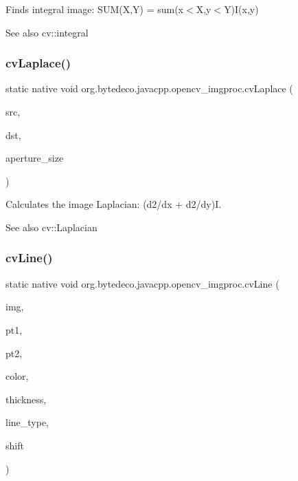 Finds integral image\+: S\+U\+M(\+X,\+Y) = sum(x$<$\+X,y$<$\+Y)I(x,y) 

\begin{DoxySeeAlso}{See also}
cv\+::integral 
\end{DoxySeeAlso}
\mbox{\label{group__imgproc__c_ga4b503d9c276d19dbced13ecd77b845a2}} 
\subsubsection{\texorpdfstring{cv\+Laplace()}{cvLaplace()}}
{\footnotesize\ttfamily static native void org.\+bytedeco.\+javacpp.\+opencv\+\_\+imgproc.\+cv\+Laplace (\begin{DoxyParamCaption}\item[{@Const Cv\+Arr}]{src,  }\item[{Cv\+Arr}]{dst,  }\item[{int}]{aperture\+\_\+size }\end{DoxyParamCaption})\hspace{0.3cm}{\ttfamily [static]}}



Calculates the image Laplacian\+: (d2/dx + d2/dy)I. 

\begin{DoxySeeAlso}{See also}
cv\+::\+Laplacian 
\end{DoxySeeAlso}
\mbox{\label{group__imgproc__c_ga98780c8da54f8a1c4de80969b71395fd}} 
\subsubsection{\texorpdfstring{cv\+Line()}{cvLine()}}
{\footnotesize\ttfamily static native void org.\+bytedeco.\+javacpp.\+opencv\+\_\+imgproc.\+cv\+Line (\begin{DoxyParamCaption}\item[{Cv\+Arr}]{img,  }\item[{@By\+Val Cv\+fr.antproject.utils.Point}]{pt1,  }\item[{@By\+Val Cv\+fr.antproject.utils.Point}]{pt2,  }\item[{@By\+Val Cv\+Scalar}]{color,  }\item[{int}]{thickness,  }\item[{int}]{line\+\_\+type,  }\item[{int}]{shift }\end{DoxyParamCaption})\hspace{0.3cm}{\ttfamily [static]}}



